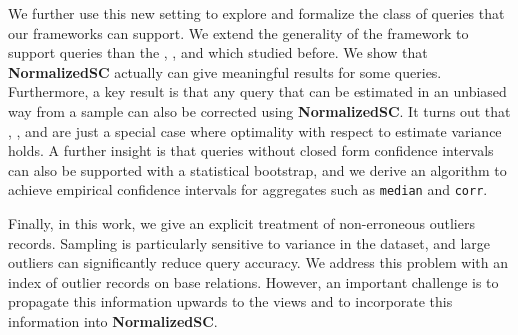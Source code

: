 We further use this new setting to explore and formalize the class of queries that our frameworks can support.
We extend the generality of the framework to support queries than the \sumfunc, \avgfunc, and \countfunc which studied before.
We show that \textbf{NormalizedSC} actually can give meaningful results for some \selectfunc queries.
Furthermore, a key result is that any query that can be estimated in an unbiased way from a sample can also be corrected using \textbf{NormalizedSC}.
It turns out that \sumfunc, \avgfunc, and \countfunc are just a special case where optimality with respect to estimate variance holds.
A further insight is that queries without closed form confidence intervals can also be supported with a statistical bootstrap, and we
derive an algorithm to achieve empirical confidence intervals for aggregates such as \texttt{median} and \texttt{corr}.

Finally, in this work, we give an explicit treatment of non-erroneous outliers records.
Sampling is particularly sensitive to variance in the dataset, and large outliers can significantly reduce query accuracy.
We address this problem with an index of outlier records on base relations.
However, an important challenge is to propagate this information upwards to the views and to incorporate this information into \textbf{NormalizedSC}.





